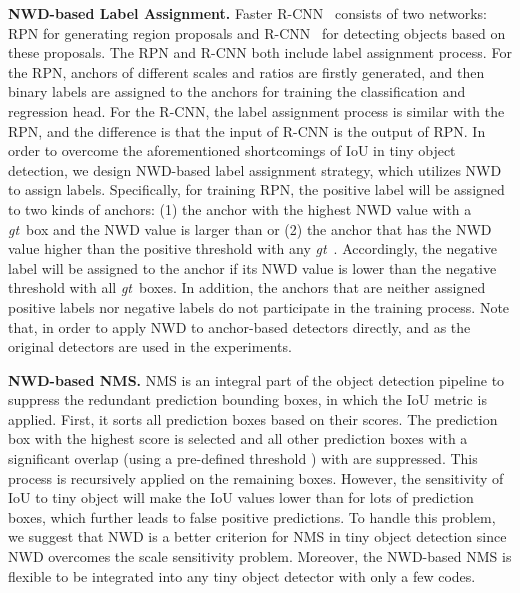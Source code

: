 \documentclass{article}
\newcommand{\gt}{\textit{gt}~}
\begin{document}
\textbf{NWD-based Label Assignment.} Faster R-CNN~\cite{Faster-R-CNN_2015_NIPS} consists of two networks: RPN for generating region proposals and R-CNN~\cite{Fast-R-CNN_2015_ICCV} for detecting objects based on these proposals. The RPN and R-CNN both include label assignment process. For the RPN, anchors of different scales and ratios are firstly generated, and then binary labels are assigned to the anchors for training the classification and regression head. For the R-CNN, the label assignment process is similar with the RPN, and the difference is that the input of R-CNN is the output of RPN. In order to overcome the aforementioned shortcomings of IoU in tiny object detection, we design NWD-based label assignment strategy, which utilizes NWD to assign labels. Specifically, for training RPN, the positive label will be assigned to two kinds of anchors: (1) the anchor with the highest NWD value with a \gt box and the NWD value is larger than  or (2) the anchor that has the NWD value higher than the positive threshold  with any \gt. Accordingly, the negative label will be assigned to the anchor if its NWD value is lower than the negative threshold  with all \gt boxes. In addition, the anchors that are neither assigned positive labels nor negative labels do not participate in the training process. Note that, in order to apply NWD to anchor-based detectors directly,  and  as the original detectors are used in the experiments.

\textbf{NWD-based NMS.} NMS is an integral part of the object detection pipeline to suppress the redundant prediction bounding boxes, in which the IoU metric is applied. First, it sorts all prediction boxes based on their scores. The prediction box  with the highest score is selected and all other prediction boxes with a significant overlap (using a pre-defined threshold ) with  are suppressed. This process is recursively applied on the remaining boxes. However, the sensitivity of IoU to tiny object will make the IoU values lower than  for lots of prediction boxes, which further leads to false positive predictions. To handle this problem, we suggest that NWD is a better criterion for NMS in tiny object detection since NWD overcomes the scale sensitivity problem. Moreover, the NWD-based NMS is flexible to be integrated into any tiny object detector with only a few codes.
\end{document}
